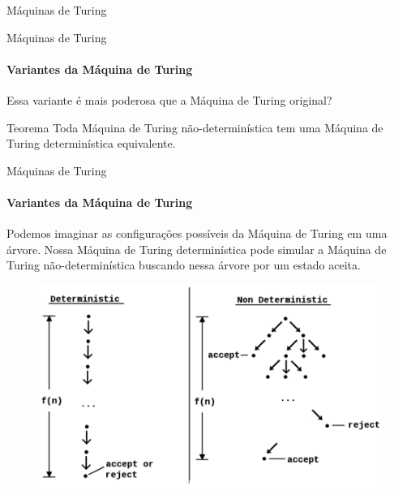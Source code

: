 \documentclass{beamer}
\begin{document}
\begin{frame}{Máquinas de Turing}
	\begin{center}
	\end{center}
\end{frame}
\begin{frame}{Máquinas de Turing}
	\framesubtitle{Variantes da Máquina de Turing}
	Essa variante é mais poderosa que a Máquina de Turing original? \pause
	\begin{block}{Teorema}
		Toda Máquina de Turing não-determinística tem uma Máquina de Turing determinística equivalente.
	\end{block}
\end{frame}
\begin{frame}{Máquinas de Turing}
	\framesubtitle{Variantes da Máquina de Turing}
	Podemos imaginar as configurações possíveis da Máquina de Turing em uma árvore. Nossa Máquina de Turing determinística pode simular a Máquina de Turing não-determinística buscando nessa árvore por um estado aceita.
	\begin{figure}
		\includegraphics[width=0.6\paperwidth]{resources/nondeterministic}
	\end{figure}
\end{frame}
\end{document}
